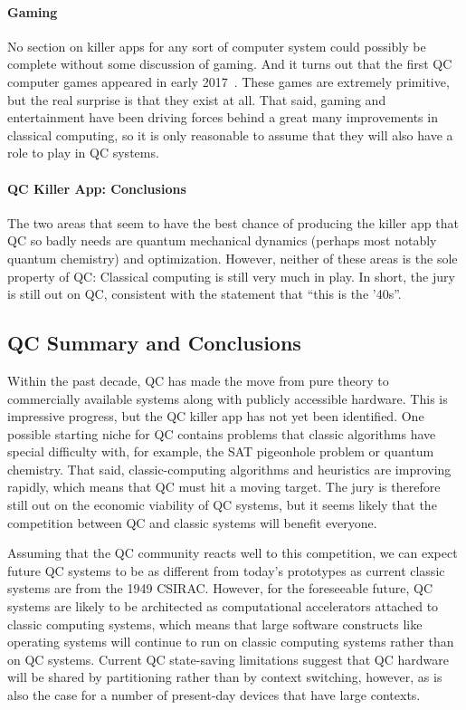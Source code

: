 \paragraph{Gaming}
\label{sec:future:Gaming}

No section on killer apps for any sort of computer system could possibly
be complete without some discussion of gaming.
And it turns out that the first QC computer games appeared in early
2017~\cite{JamesWootton2017IBMQEgame,JamesWootton2017IBMQEbattleship}.
These games are extremely primitive, but the real surprise is that
they exist at all.
That said, gaming and entertainment have been driving forces
behind a great many improvements in classical computing, so it is
only reasonable to assume that they will also have a role to play
in QC systems.

\paragraph{QC Killer App: Conclusions}
\label{sec:future:QC Killer App: Conclusions}

The two areas that seem to have the best chance of producing the killer
app that QC so badly needs are quantum mechanical dynamics (perhaps
most notably quantum chemistry) and optimization.
However, neither of these areas is the sole property of QC: Classical
computing is still very much in play.
In short, the jury is still out on QC, consistent with the
statement that ``this is the '40s''.

\subsection{QC Summary and Conclusions}
\label{sec:future:QC Summary and Conclusions}

Within the past decade, QC has made the move from pure theory to
commercially available systems along with publicly accessible hardware.
This is impressive progress, but the QC killer app has not yet been
identified.
One possible starting niche for QC contains problems that classic algorithms
have special difficulty with, for example, the SAT pigeonhole problem
or quantum chemistry.
That said, classic-computing algorithms and heuristics are improving
rapidly, which means that QC must hit a moving target.
The jury is therefore still out on the economic viability of QC systems,
but it seems likely that the competition between
QC and classic systems will benefit everyone.

Assuming that the QC community reacts well to this competition,
we can expect future QC systems to be as different from
today's prototypes as current classic systems are from the 1949 CSIRAC.
However, for the foreseeable future, QC systems are likely to be
architected as computational accelerators attached to classic computing
systems,
which means that large software constructs like operating systems will
continue to run on classic computing systems rather than on QC systems.
Current QC state-saving limitations suggest that QC hardware will be shared by
partitioning rather than by context switching, however, as is also
the case for a number of present-day devices that have large contexts.

